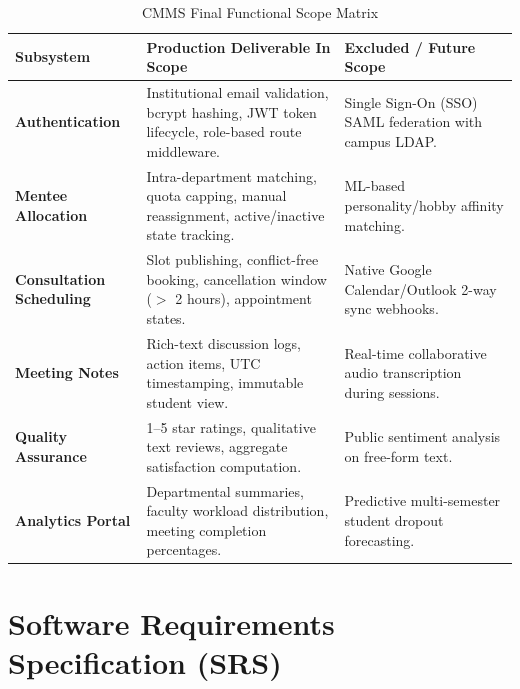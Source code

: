 \documentclass[11pt,a4paper]{article}
\begin{document}
\begin{table}[H]
\centering
\small
\begin{tabularx}{\textwidth}{p{3.2cm}Xp{3.8cm}}
\toprule
\rowcolor{lightgray} \textbf{Subsystem} & \textbf{Production Deliverable In Scope} & \textbf{Excluded / Future Scope} \\
\midrule
\textbf{Authentication} & Institutional email validation, bcrypt hashing, JWT token lifecycle, role-based route middleware. & Single Sign-On (SSO) SAML federation with campus LDAP. \\
\midrule
\textbf{Mentee Allocation} & Intra-department matching, quota capping, manual reassignment, active/inactive state tracking. & ML-based personality/hobby affinity matching. \\
\midrule
\textbf{Consultation Scheduling} & Slot publishing, conflict-free booking, cancellation window ($>$ 2 hours), appointment states. & Native Google Calendar/Outlook 2-way sync webhooks. \\
\midrule
\textbf{Meeting Notes} & Rich-text discussion logs, action items, UTC timestamping, immutable student view. & Real-time collaborative audio transcription during sessions. \\
\midrule
\textbf{Quality Assurance} & 1--5 star ratings, qualitative text reviews, aggregate satisfaction computation. & Public sentiment analysis on free-form text. \\
\midrule
\textbf{Analytics Portal} & Departmental summaries, faculty workload distribution, meeting completion percentages. & Predictive multi-semester student dropout forecasting. \\
\bottomrule
\end{tabularx}
\caption{CMMS Final Functional Scope Matrix}
\label{tab:scope}
\end{table}

\section{Software Requirements Specification (SRS)}
\end{document}
